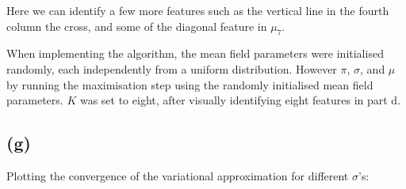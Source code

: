 \documentclass[12pt]{article}
\begin{document}
Here we can identify a few more features such as the vertical line in the fourth column the cross, and some of the diagonal feature in $\mu_7$.

When implementing the algorithm, the mean field parameters were initialised randomly, each independently from a uniform distribution. However $\pi$, $\sigma$, and $\mu$ by running the maximisation step using the randomly initialised mean field parameters. $K$ was set to eight, after visually identifying eight features in part d.


\newpage
\subsection*{(g)}


Plotting the convergence of the variational approximation for different $\sigma$'s:
\end{document}
